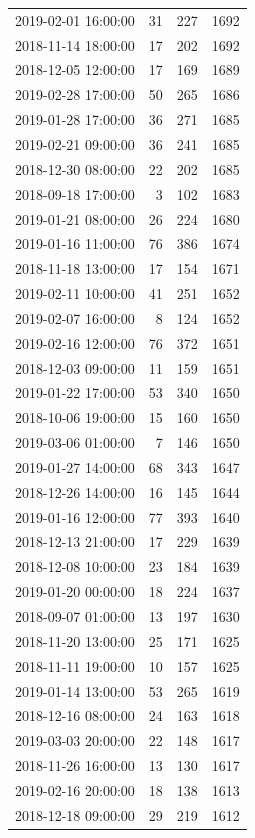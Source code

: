\begin{tabular}{lrrr}
2019-02-01 16:00:00 & 31 & 227 & 1692 \\
2018-11-14 18:00:00 & 17 & 202 & 1692 \\
2018-12-05 12:00:00 & 17 & 169 & 1689 \\
2019-02-28 17:00:00 & 50 & 265 & 1686 \\
2019-01-28 17:00:00 & 36 & 271 & 1685 \\
2019-02-21 09:00:00 & 36 & 241 & 1685 \\
2018-12-30 08:00:00 & 22 & 202 & 1685 \\
2018-09-18 17:00:00 & 3 & 102 & 1683 \\
2019-01-21 08:00:00 & 26 & 224 & 1680 \\
2019-01-16 11:00:00 & 76 & 386 & 1674 \\
2018-11-18 13:00:00 & 17 & 154 & 1671 \\
2019-02-11 10:00:00 & 41 & 251 & 1652 \\
2019-02-07 16:00:00 & 8 & 124 & 1652 \\
2019-02-16 12:00:00 & 76 & 372 & 1651 \\
2018-12-03 09:00:00 & 11 & 159 & 1651 \\
2019-01-22 17:00:00 & 53 & 340 & 1650 \\
2018-10-06 19:00:00 & 15 & 160 & 1650 \\
2019-03-06 01:00:00 & 7 & 146 & 1650 \\
2019-01-27 14:00:00 & 68 & 343 & 1647 \\
2018-12-26 14:00:00 & 16 & 145 & 1644 \\
2019-01-16 12:00:00 & 77 & 393 & 1640 \\
2018-12-13 21:00:00 & 17 & 229 & 1639 \\
2018-12-08 10:00:00 & 23 & 184 & 1639 \\
2019-01-20 00:00:00 & 18 & 224 & 1637 \\
2018-09-07 01:00:00 & 13 & 197 & 1630 \\
2018-11-20 13:00:00 & 25 & 171 & 1625 \\
2018-11-11 19:00:00 & 10 & 157 & 1625 \\
2019-01-14 13:00:00 & 53 & 265 & 1619 \\
2018-12-16 08:00:00 & 24 & 163 & 1618 \\
2019-03-03 20:00:00 & 22 & 148 & 1617 \\
2018-11-26 16:00:00 & 13 & 130 & 1617 \\
2019-02-16 20:00:00 & 18 & 138 & 1613 \\
2018-12-18 09:00:00 & 29 & 219 & 1612 \\

\end{tabular}
